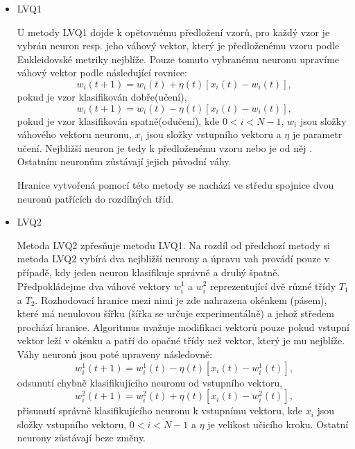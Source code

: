 \documentclass[11pt,twoside,a4paper]{book}
\begin{document}
\begin{itemize}
\item LVQ1

U metody LVQ1 dojde k opětovnému předložení vzorů, pro každý vzor je vybrán neuron resp. jeho váhový vektor, který je předloženému vzoru podle Eukleidovské metriky nejblíže. Pouze tomuto vybranému neuronu upravíme váhový vektor podle následující rovnice:
\begin{equation}
w_{i}(t+1)=w_{i}(t)+\eta (t)\left[x_{i}(t)-w_{i}(t)\right]\mbox{,}
\end{equation}
pokud je vzor klasifikován dobře(učení),
\begin{equation}
w_{i}(t+1)=w_{i}(t)-\eta (t)\left[x_{i}(t)-w_{i}(t)\right]\mbox{,}
\end{equation}
pokud je vzor klasifikován spatně(odučení), kde $0<i<N-1$, $w_{i}$ jsou složky váhového vektoru neuronu, $x_{i}$ jsou složky vstupního vektoru a $\eta$ je parametr učení. Nejbližší neuron je tedy  k předloženému vzoru nebo je od něj . Ostatním neuronům zůstávají jejich původní váhy.

Hranice vytvořená pomocí této metody se nachází ve středu spojnice dvou neuronů patřících do rozdílných tříd.
\item LVQ2

Metoda LVQ2 zpřesňuje metodu LVQ1. Na rozdíl od předchozí metody si metoda LVQ2 vybírá dva nejbližší neurony a úpravu vah provádí pouze v případě, kdy jeden neuron klasifikuje správně a druhý špatně. Předpokládejme dva váhové vektory $w^{1}_{i}$ a $w^{2}_{i}$ reprezentující dvě různé třídy $T_{1}$ a $T_{2}$. Rozhodovací hranice mezi nimi je zde nahrazena okénkem (pásem), které má nenulovou šířku (šířka se určuje experimentálně\cite{skripta}) a jehož středem prochází hranice. Algoritmus uvažuje modifikaci vektorů pouze pokud vstupní vektor leží v okénku a patří do opačné třídy než vektor, který je mu nejblíže. Váhy neuronů jsou poté upraveny následovně:
\begin{equation}
w_{i}^{1}(t+1)=w_{i}^{1}(t)-\eta (t)\left[x_{i}(t)-w_{i}^{1}(t)\right]\mbox{,}
\end{equation}
odsunutí chybně klasifikujícího neuronu od vstupního vektoru,
\begin{equation}
w_{i}^{2}(t+1)=w_{i}^{2}(t)+\eta (t)\left[x_{i}(t)-w_{i}^{2}(t)\right]\mbox{,}
\end{equation}
přisunutí správně klasifikujícího neuronu k vstupnímu vektoru, kde $x_{i}$ jsou složky vstupního vektoru, $0<i<N-1$ a $\eta$ je velikost učicího kroku. Ostatní neurony zůstávají beze změny.


\end{itemize}
\end{document}

